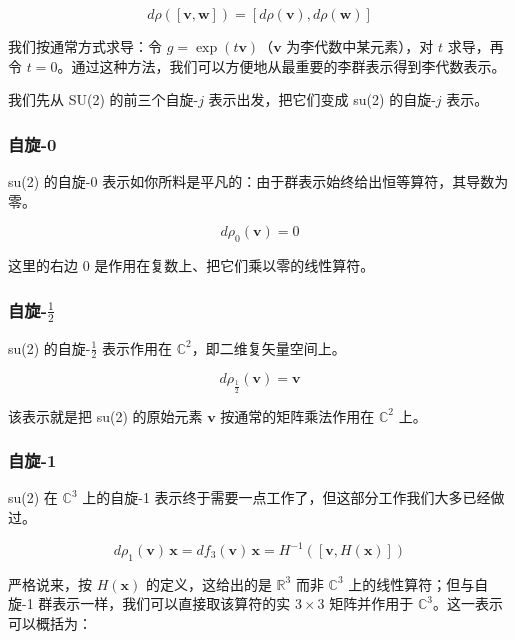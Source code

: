\begin{equation}
d\rho([\mathbf{v},\mathbf{w}]) = [d\rho(\mathbf{v}), d\rho(\mathbf{w})]
\end{equation}

我们按通常方式求导：令 $g=\exp(t\mathbf{v})$（$\mathbf{v}$ 为李代数中某元素），对 $t$ 求导，再令 $t=0$。通过这种方法，我们可以方便地从最重要的李群表示得到李代数表示。

我们先从 SU(2) 的前三个自旋-$j$ 表示出发，把它们变成 su(2) 的自旋-$j$ 表示。

\subsubsection{自旋-0}

su(2) 的自旋-0 表示如你所料是平凡的：由于群表示始终给出恒等算符，其导数为零。

\begin{equation}
d\rho_0(\mathbf{v}) = 0
\end{equation}

这里的右边 0 是作用在复数上、把它们乘以零的线性算符。

\subsubsection{自旋-$\tfrac12$}

su(2) 的自旋-$\tfrac12$ 表示作用在 $\mathbb{C}^{2}$，即二维复矢量空间上。

\begin{equation}
d\rho_{\frac12}(\mathbf{v}) = \mathbf{v}
\end{equation}

该表示就是把 su(2) 的原始元素 $\mathbf{v}$ 按通常的矩阵乘法作用在 $\mathbb{C}^{2}$ 上。

\subsubsection{自旋-1}

su(2) 在 $\mathbb{C}^{3}$ 上的自旋-1 表示终于需要一点工作了，但这部分工作我们大多已经做过。

\begin{equation}
d\rho_1(\mathbf{v})\,\mathbf{x} = df_3(\mathbf{v})\,\mathbf{x} = H^{-1}\!\left([\mathbf{v},H(\mathbf{x})]\right)
\end{equation}

严格说来，按 $H(\mathbf{x})$ 的定义，这给出的是 $\mathbb{R}^{3}$ 而非 $\mathbb{C}^{3}$ 上的线性算符；但与自旋-1 群表示一样，我们可以直接取该算符的实 $3\times 3$ 矩阵并作用于 $\mathbb{C}^{3}$。这一表示可以概括为：

